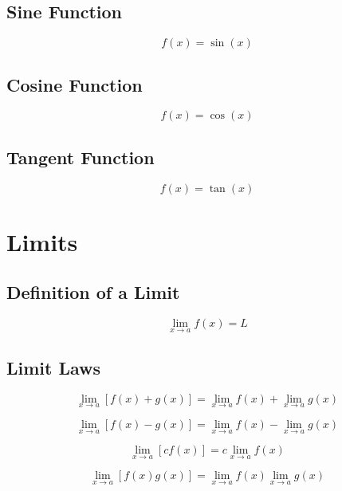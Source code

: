 \documentclass[12pt]{book}
\begin{document}
\subsection{Sine Function}
\begin{equation}
    f(x) = \sin(x)
\end{equation}

\subsection{Cosine Function}
\begin{equation}
    f(x) = \cos(x)
\end{equation}

\subsection{Tangent Function}
\begin{equation}
    f(x) = \tan(x)
\end{equation}

\section{Limits}
\subsection{Definition of a Limit}
\begin{equation}
    \lim_{x \to a} f(x) = L
\end{equation}

\subsection{Limit Laws}
\begin{equation}
    \lim_{x \to a} [f(x) + g(x)] = \lim_{x \to a} f(x) + \lim_{x \to a} g(x)
\end{equation}

\begin{equation}
    \lim_{x \to a} [f(x) - g(x)] = \lim_{x \to a} f(x) - \lim_{x \to a} g(x)
\end{equation}

\begin{equation}
    \lim_{x \to a} [cf(x)] = c \lim_{x \to a} f(x)
\end{equation}

\begin{equation}
    \lim_{x \to a} [f(x)g(x)] = \lim_{x \to a} f(x) \lim_{x \to a} g(x)
\end{equation}
\end{document}
